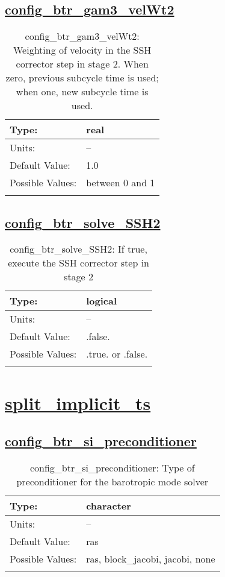 \subsection[config\_btr\_gam3\_velWt2]{\hyperref[sec:nm_tab_split_explicit_ts]{config\_btr\_gam3\_velWt2}}
\label{subsec:nm_sec_config_btr_gam3_velWt2}
\begin{center}
\begin{longtable}{| p{2.0in} || p{4.0in} |}
    \hline
    Type: & real \\
    \hline
    Units: & -- \\
    \hline
    Default Value: & 1.0 \\
    \hline
    Possible Values: & between 0 and 1 \\
    \hline
    \caption{config\_btr\_gam3\_velWt2: Weighting of velocity in the SSH corrector step in stage 2. When zero, previous subcycle time is used; when one, new subcycle time is used.}
\end{longtable}
\end{center}
\subsection[config\_btr\_solve\_SSH2]{\hyperref[sec:nm_tab_split_explicit_ts]{config\_btr\_solve\_SSH2}}
\label{subsec:nm_sec_config_btr_solve_SSH2}
\begin{center}
\begin{longtable}{| p{2.0in} || p{4.0in} |}
    \hline
    Type: & logical \\
    \hline
    Units: & -- \\
    \hline
    Default Value: & .false. \\
    \hline
    Possible Values: & .true. or .false. \\
    \hline
    \caption{config\_btr\_solve\_SSH2: If true, execute the SSH corrector step in stage 2}
\end{longtable}
\end{center}
\section[split\_implicit\_ts]{\hyperref[sec:nm_tab_split_implicit_ts]{split\_implicit\_ts}}
\label{sec:nm_sec_split_implicit_ts}
\subsection[config\_btr\_si\_preconditioner]{\hyperref[sec:nm_tab_split_implicit_ts]{config\_btr\_si\_preconditioner}}
\label{subsec:nm_sec_config_btr_si_preconditioner}
\begin{center}
\begin{longtable}{| p{2.0in} || p{4.0in} |}
    \hline
    Type: & character \\
    \hline
    Units: & -- \\
    \hline
    Default Value: & ras \\
    \hline
    Possible Values: & ras, block\_jacobi, jacobi, none \\
    \hline
    \caption{config\_btr\_si\_preconditioner: Type of preconditioner for the barotropic mode solver}
\end{longtable}
\end{center}
